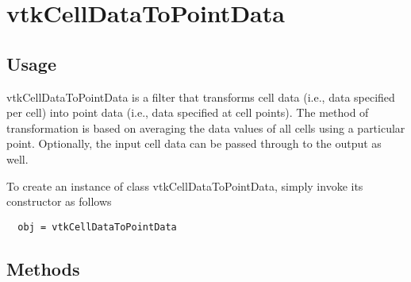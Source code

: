 \section{vtkCellDataToPointData}

\subsection{Usage}

 vtkCellDataToPointData is a filter that transforms cell data (i.e., data
 specified per cell) into point data (i.e., data specified at cell
 points). The method of transformation is based on averaging the data
 values of all cells using a particular point. Optionally, the input cell
 data can be passed through to the output as well.

To create an instance of class vtkCellDataToPointData, simply
invoke its constructor as follows
\begin{verbatim}
  obj = vtkCellDataToPointData
\end{verbatim}
\subsection{Methods}


